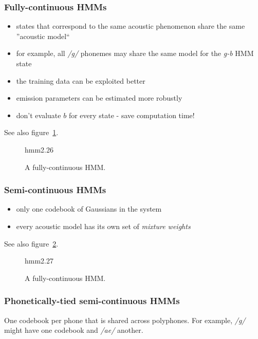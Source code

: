 \documentclass[11pt]{article}
\begin{document}
\subsubsection{Fully-continuous HMMs}
\begin{itemize}
    \item states that correspond to the same acoustic phenomenon share the same ''acoustic model``
    \item for example, all \textit{/g/} phonemes may share the same model for the \textit{g-b} HMM state
    \item the training data can be exploited better
    \item emission parameters can be estimated more robustly
    \item don't evaluate $b$ for every state - save computation time!
\end{itemize}
See also figure~\ref{fig:fullyContinuousHMMs}.
\begin{figure}[htb]
    \begin{minipage}{\linewidth}
        \vspace{6cm}
        \hfill \scriptsize hmm2.26
    \end{minipage}
    \caption{\label{fig:fullyContinuousHMMs} A fully-continuous HMM.}
\end{figure}

\subsubsection{Semi-continuous HMMs}
\begin{itemize}
    \item only one codebook of Gaussians in the system
    \item every acoustic model has its own set of \textit{mixture weights}
\end{itemize}
See also figure~\ref{fig:semiContinuousHMMs}.
\begin{figure}[htb]
    \begin{minipage}{\linewidth}
        \vspace{6cm}
        \hfill \scriptsize hmm2.27
    \end{minipage}
    \caption{\label{fig:semiContinuousHMMs} A fully-continuous HMM.}
\end{figure}

\subsubsection{Phonetically-tied semi-continuous HMMs}
One codebook per phone that is shared across polyphones. For example, \textit{/g/} might have one codebook and \textit{/ae/} another.
\end{document}
